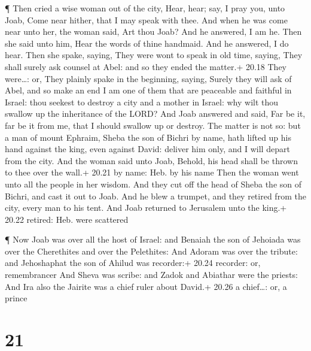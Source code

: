  ¶ Then cried a wise woman out of the city, Hear, hear;
say, I pray you, unto Joab, Come near hither, that I may speak with
thee.  And when he was come near unto her, the woman said,
Art thou Joab? And he answered, I am he. Then she said unto him, Hear
the words of thine handmaid. And he answered, I do hear. 
Then she spake, saying, They were wont to speak in old time, saying,
They shall surely ask counsel at Abel: and so they ended the matter.+
20.18 They were\ldots: or, They plainly spake in the beginning, saying,
Surely they will ask of Abel, and so make an end  I am one
of them that are peaceable and faithful in Israel: thou seekest to
destroy a city and a mother in Israel: why wilt thou swallow up the
inheritance of the LORD?  And Joab answered and said, Far
be it, far be it from me, that I should swallow up or destroy.
 The matter is not so: but a man of mount Ephraim, Sheba
the son of Bichri by name, hath lifted up his hand against the king,
even against David: deliver him only, and I will depart from the city.
And the woman said unto Joab, Behold, his head shall be thrown to thee
over the wall.+ 20.21 by name: Heb. by his name  Then the
woman went unto all the people in her wisdom. And they cut off the head
of Sheba the son of Bichri, and cast it out to Joab. And he blew a
trumpet, and they retired from the city, every man to his tent. And Joab
returned to Jerusalem unto the king.+ 20.22 retired: Heb. were scattered

 ¶ Now Joab was over all the host of Israel: and Benaiah
the son of Jehoiada was over the Cherethites and over the Pelethites:
 And Adoram was over the tribute: and Jehoshaphat the son
of Ahilud was recorder:+ 20.24 recorder: or, remembrancer 
And Sheva was scribe: and Zadok and Abiathar were the priests:
 And Ira also the Jairite was a chief ruler about David.+
20.26 a chief\ldots: or, a prince

\hypertarget{section-20}{%
\section{21}\label{section-20}}

